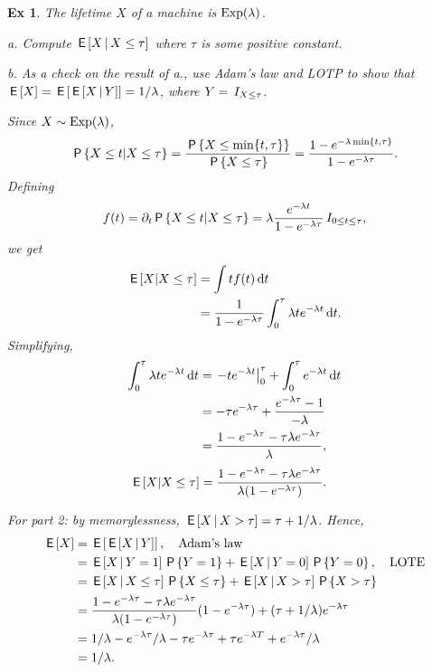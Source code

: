 \documentclass[a4paper,11pt]{article}
\newtheorem{exercise}[theorem]{Ex}
\begin{document}
\begin{exercise}
The lifetime $X$ of a machine is $\Exp{\lambda}$.

a. Compute $\E{X \given X\leq \tau}$ where $\tau$ is some positive constant.

b. As a \emph{check} on the result of a., use  Adam's law and LOTP to show that $\E{X} = \E{\E{X\given Y}} = 1/\lambda$, where $Y=\1{X\leq \tau}$.
\begin{solution}
Since $X\sim \Exp{\lambda}$,
\begin{equation*}
\P{X\leq t | X\leq \tau} = \frac{\P{X\leq \min\{t, \tau\}}}{\P{X\leq \tau}} = \frac{1-e^{-\lambda\min\{t, \tau\}}}{1-e^{-\lambda \tau}}.
\end{equation*}
 Defining
\begin{equation*}
  f(t) = \partial_{t} \P{X\leq t | X\leq \tau} = \lambda \frac{e^{-\lambda t}}{1-e^{-\lambda \tau}} \1{0\leq t \leq \tau},
\end{equation*}
we get
\begin{align}
  \label{eq:9925}
\E{X|X\leq \tau}
&= \int t f(t) \d t \\
&= \frac{1}{1-e^{-\lambda \tau}}\int_{0}^{\tau} \lambda t e^{-\lambda t} \d t.
\end{align}
Simplifying,
\begin{align}
\label{eq:926}
\int_0^{\tau} \lambda t e^{-\lambda t} \d t
&= \left.- t e^{-\lambda t}\right|_{0}^{\tau} + \int_0^{\tau} e^{-\lambda t} \d t \\
&= -\tau e^{-\lambda \tau} + \frac{e^{-\lambda \tau} -1}{-\lambda} \\
&= \frac{ 1- e^{-\lambda \tau}- \tau \lambda  e^{-\lambda \tau}}{\lambda},
\end{align}
\begin{align}
  \label{eq:925}
\E{X|X\leq \tau}
&= \frac{ 1- e^{-\lambda \tau}- \tau \lambda  e^{-\lambda \tau}}{\lambda(1-e^{-\lambda \tau})}.
\end{align}

For part 2: by memorylessness, $\E{X\given X>\tau} = \tau + 1/\lambda$. Hence,
\begin{align}
  \label{eq:94}
\E X
&= \E{\E{X\given Y}}, \quad \text{Adam's law} \\
&= \E{X\given Y=1}\P{Y=1} + \E{X\given Y=0}\P{Y=0}, \quad \text{LOTE}\\
&= \E{X\given X\leq \tau}\P{X\leq \tau} + \E{X\given X>\tau} \P{X>\tau} \\
&= \frac{ 1- e^{-\lambda \tau}- \tau \lambda  e^{-\lambda \tau}}{\lambda(1-e^{-\lambda \tau})} (1-e^{-\lambda \tau}) + (\tau+ 1/\lambda) e^{-\lambda \tau} \\
&= 1/\lambda - e^{-\lambda \tau}/\lambda - \tau e^{-\lambda \tau} + \tau e^{-\lambda T} + e^{-\lambda \tau}/\lambda \\
&=1/\lambda.
\end{align}


\end{solution}
\end{exercise}
\end{document}
